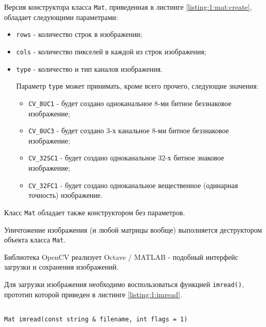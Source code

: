 Версия конструктора класса \verb|Mat|, приведенная в листинге \ref{listing:1:mat:create}, обладает следующими параметрами:

\begin{itemize}

	\item \verb|rows| - количество строк в изображении;
	\item \verb|cols| - количество пикселей в каждой из строк изображения;
	\item \verb|type| - количество и тип каналов изображения.

	Параметр \verb|type| может принимать, кроме всего прочего, следующие значения:

	\begin{itemize}

		\item \verb|CV_8UC1| - будет создано одноканальное 8-ми битное беззнаковое изображение;
		\item \verb|CV_8UC3| - будет создано 3-х канальное 8-ми битное беззнаковое изображение;
		\item \verb|CV_32SC1| - будет создано одноканальное 32-х битное знаковое изображение;
		\item \verb|CV_32FC1| - будет создано одноканальное вещественное (одинарная точность) изображение.

	\end{itemize}

\end{itemize}

Класс \verb|Mat| обладает также конструктором без параметров.

Уничтожение изображения (и любой матрицы вообще) выполняется деструктором объекта класса \verb|Mat|.


Библиотека OpenCV реализует Octave / MATLAB - подобный интерфейс загрузки и сохранения изображений.

Для загрузки изображения необходимо воспользоваться функцией \verb|imread()|, прототип которой приведен в листинге \ref{listing:1:imread}.

\begin{lstlisting}

Mat imread(const string & filename, int flags = 1)

\end{lstlisting}
\mylistingend

